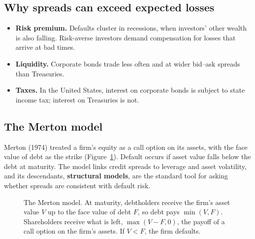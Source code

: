 \subsection{Why spreads can exceed expected losses}

\begin{itemize}
  \item \textbf{Risk premium.} Defaults cluster in recessions, when investors' other wealth is also falling. Risk-averse investors demand compensation for losses that arrive at bad times.
  \item \textbf{Liquidity.} Corporate bonds trade less often and at wider bid--ask spreads than Treasuries.
  \item \textbf{Taxes.} In the United States, interest on corporate bonds is subject to state income tax; interest on Treasuries is not.
\end{itemize}

\subsection{The Merton model}

Merton (1974) treated a firm's equity as a call option on its assets, with the face value of debt as the strike (Figure~\ref{fig:17-merton}). Default occurs if asset value falls below the debt at maturity. The model links credit spreads to leverage and asset volatility, and its descendants, \textbf{structural models}, are the standard tool for asking whether spreads are consistent with default risk.

\begin{figure}[htbp]
\centering
{}
\caption{The Merton model. At maturity, debtholders receive the firm's asset value $V$ up to the face value of debt $F$, so debt pays $\min(V, F)$. Shareholders receive what is left, $\max(V - F, 0)$, the payoff of a call option on the firm's assets. If $V < F$, the firm defaults.}
\label{fig:17-merton}
\end{figure}

